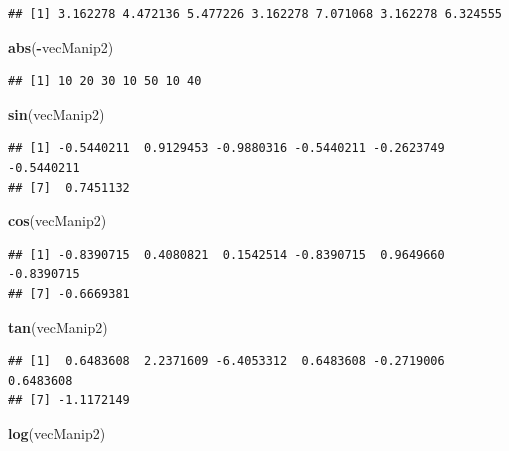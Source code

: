 \documentclass[]{book}
\newenvironment{Shaded}{\begin{snugshade}}{\end{snugshade}}
\newcommand{\KeywordTok}[1]{\textcolor[rgb]{0.13,0.29,0.53}{\textbf{#1}}}
\newcommand{\OperatorTok}[1]{\textcolor[rgb]{0.81,0.36,0.00}{\textbf{#1}}}
\newcommand{\NormalTok}[1]{#1}
\begin{document}
\begin{verbatim}
## [1] 3.162278 4.472136 5.477226 3.162278 7.071068 3.162278 6.324555
\end{verbatim}

\begin{Shaded}
\begin{Highlighting}[]
\KeywordTok{abs}\NormalTok{(}\OperatorTok{-}\NormalTok{vecManip2)}
\end{Highlighting}
\end{Shaded}

\begin{verbatim}
## [1] 10 20 30 10 50 10 40
\end{verbatim}

\begin{Shaded}
\begin{Highlighting}[]
\KeywordTok{sin}\NormalTok{(vecManip2)}
\end{Highlighting}
\end{Shaded}

\begin{verbatim}
## [1] -0.5440211  0.9129453 -0.9880316 -0.5440211 -0.2623749 -0.5440211
## [7]  0.7451132
\end{verbatim}

\begin{Shaded}
\begin{Highlighting}[]
\KeywordTok{cos}\NormalTok{(vecManip2)}
\end{Highlighting}
\end{Shaded}

\begin{verbatim}
## [1] -0.8390715  0.4080821  0.1542514 -0.8390715  0.9649660 -0.8390715
## [7] -0.6669381
\end{verbatim}

\begin{Shaded}
\begin{Highlighting}[]
\KeywordTok{tan}\NormalTok{(vecManip2)}
\end{Highlighting}
\end{Shaded}

\begin{verbatim}
## [1]  0.6483608  2.2371609 -6.4053312  0.6483608 -0.2719006  0.6483608
## [7] -1.1172149
\end{verbatim}

\begin{Shaded}
\begin{Highlighting}[]
\KeywordTok{log}\NormalTok{(vecManip2)}
\end{Highlighting}
\end{Shaded}
\end{document}
